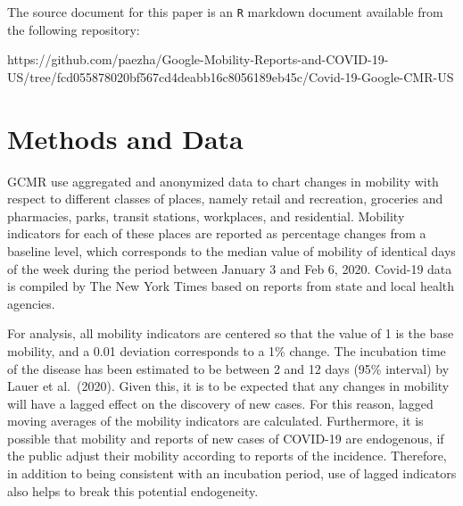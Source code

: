 \documentclass[]{elsarticle} %
\begin{document}
The source document for this paper is an \texttt{R} markdown document
available from the following repository:

https://github.com/paezha/Google-Mobility-Reports-and-COVID-19-US/tree/fcd055878020bf567cd4deabb16c8056189eb45c/Covid-19-Google-CMR-US

\hypertarget{methods-and-data}{%
\section{Methods and Data}\label{methods-and-data}}

GCMR use aggregated and anonymized data to chart changes in mobility
with respect to different classes of places, namely retail and
recreation, groceries and pharmacies, parks, transit stations,
workplaces, and residential. Mobility indicators for each of these
places are reported as percentage changes from a baseline level, which
corresponds to the median value of mobility of identical days of the
week during the period between January 3 and Feb 6, 2020. Covid-19 data
is compiled by The New York Times based on reports from state and local
health agencies.

For analysis, all mobility indicators are centered so that the value of
1 is the base mobility, and a 0.01 deviation corresponds to a 1\%
change. The incubation time of the disease has been estimated to be
between 2 and 12 days (95\% interval) by Lauer et al.~(2020). Given
this, it is to be expected that any changes in mobility will have a
lagged effect on the discovery of new cases. For this reason, lagged
moving averages of the mobility indicators are calculated. Furthermore,
it is possible that mobility and reports of new cases of COVID-19 are
endogenous, if the public adjust their mobility according to reports of
the incidence. Therefore, in addition to being consistent with an
incubation period, use of lagged indicators also helps to break this
potential endogeneity.
\end{document}

